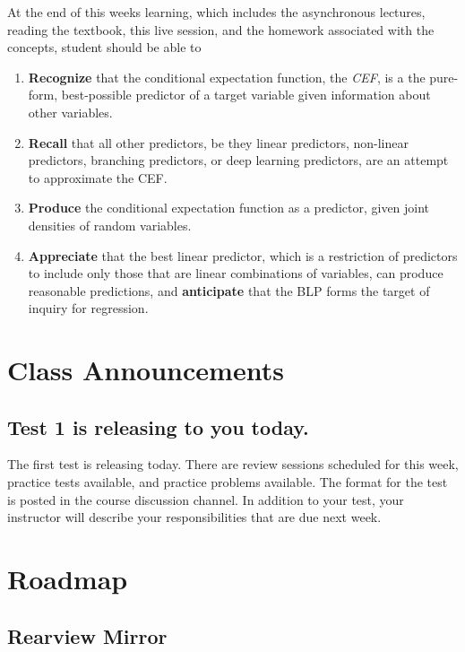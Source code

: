 \documentclass[
  letterpaper,
  DIV=11,
  numbers=noendperiod]{scrreprt}
\providecommand{\tightlist}{%
  \setlength{\itemsep}{0pt}\setlength{\parskip}{0pt}}\usepackage{longtable,booktabs,array}
\begin{document}
At the end of this weeks learning, which includes the asynchronous
lectures, reading the textbook, this live session, and the homework
associated with the concepts, student should be able to

\begin{enumerate}
\def\labelenumi{\arabic{enumi}.}
\tightlist
\item
  \textbf{Recognize} that the conditional expectation function, the
  \emph{CEF}, is a the pure-form, best-possible predictor of a target
  variable given information about other variables.
\item
  \textbf{Recall} that all other predictors, be they linear predictors,
  non-linear predictors, branching predictors, or deep learning
  predictors, are an attempt to approximate the CEF.
\item
  \textbf{Produce} the conditional expectation function as a predictor,
  given joint densities of random variables.
\item
  \textbf{Appreciate} that the best linear predictor, which is a
  restriction of predictors to include only those that are linear
  combinations of variables, can produce reasonable predictions, and
  \textbf{anticipate} that the BLP forms the target of inquiry for
  regression.
\end{enumerate}

\section{Class Announcements}\label{class-announcements-2}

\subsection{Test 1 is releasing to you
today.}\label{test-1-is-releasing-to-you-today.}

The first test is releasing today. There are review sessions scheduled
for this week, practice tests available, and practice problems
available. The format for the test is posted in the course discussion
channel. In addition to your test, your instructor will describe your
responsibilities that are due next week.

\section{Roadmap}\label{roadmap}

\subsection{Rearview Mirror}\label{rearview-mirror}
\end{document}
